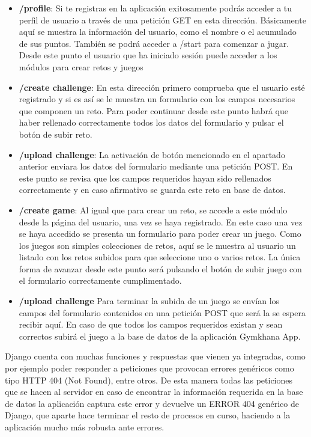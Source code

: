 \documentclass[a4paper, 12pt]{book}
\begin{document}
\begin{itemize}
	\item \textbf {/profile}: Si te registras en la aplicación exitosamente podrás acceder a tu perfil de usuario a través de una petición GET en esta dirección. Básicamente aquí se muestra la información del usuario, como el nombre o el acumulado de sus puntos. También se podrá acceder a /start para comenzar a jugar. Desde este punto el usuario que ha iniciado sesión puede acceder a los módulos para crear retos y juegos 
	\item \textbf {/create challenge}: En esta dirección primero comprueba que el usuario esté registrado y si es así se le muestra un formulario con los campos necesarios que componen un reto. Para poder continuar desde este punto habrá que haber rellenado correctamente todos los datos del formulario y pulsar el botón de subir reto. 
	\item \textbf {/upload challenge}: La activación de botón mencionado en el apartado anterior enviara los datos del formulario mediante una petición POST. En este punto se revisa que los campos requeridos hayan sido rellenados correctamente y en caso afirmativo se guarda este reto en base de datos.  
	\item \textbf {/create game}: Al igual que para crear un reto, se accede a este módulo desde la página del usuario, una vez se haya registrado. En este caso una vez se haya accedido se presenta un formulario para poder crear un juego. Como los juegos son simples colecciones de retos, aquí se le muestra al usuario un listado con los retos subidos para que seleccione uno o varios retos. La única forma de avanzar desde este punto será pulsando el botón de subir juego con el formulario correctamente cumplimentado. 
	\item \textbf {/upload challenge} Para terminar la subida de un juego se envían los campos del formulario contenidos en una petición POST que será la se espera recibir aquí. En caso de que todos los campos requeridos existan y sean correctos subirá el juego a la base de datos de la aplicación Gymkhana App.
	
\end{itemize}

Django cuenta con muchas funciones y respuestas que vienen ya integradas, como por ejemplo poder responder a peticiones que provocan errores genéricos como tipo HTTP 404 (Not Found), entre otros. De esta manera todas las peticiones que se hacen al servidor en caso de encontrar la información requerida en la base de datos la aplicación captura este error y devuelve un ERROR 404 genérico de Django, que aparte hace terminar el resto de procesos en curso, haciendo a la aplicación mucho más robusta ante errores. 
\end{document}
